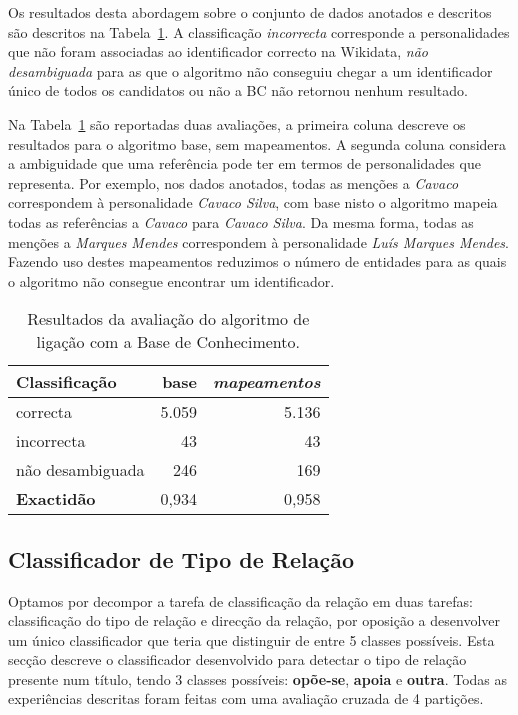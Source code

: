 \documentclass[a4paper, twocolumn, 11pt, twoside]{article}
\begin{document}
Os resultados desta abordagem sobre o conjunto de dados anotados e descritos são descritos na Tabela~\ref{tab:ent_linking_results}. A classificação \textit{incorrecta} corresponde a personalidades que não foram associadas ao identificador correcto na Wikidata, \textit{não desambiguada} para as que o algoritmo não conseguiu chegar a um identificador único de todos os candidatos ou não a BC não retornou nenhum resultado.

Na Tabela~\ref{tab:ent_linking_results} são reportadas duas avaliações, a primeira coluna descreve os resultados para o algoritmo base, sem mapeamentos. A segunda coluna considera a ambiguidade que uma referência pode ter em termos de personalidades que representa. Por exemplo, nos dados anotados, todas as menções a \textit{Cavaco} correspondem à personalidade \textit{Cavaco Silva}, com base nisto o algoritmo mapeia todas as referências a \textit{Cavaco} para \textit{Cavaco Silva}. Da mesma forma, todas as menções a \textit{Marques Mendes} correspondem à personalidade \textit{Luís Marques Mendes}. Fazendo uso destes mapeamentos reduzimos o número de entidades para as quais o algoritmo não consegue encontrar um identificador.

\begin{table}
    \begin{center}
    \begin{tabular}{l rr}
        {\bf Classificação} & {\bf base} & \it{{\bf mapeamentos}} \\
        \hline
        correcta            &   5.059    &  5.136   \\
        incorrecta          &      43    &    43    \\
		não desambiguada    &     246    &   169    \\    
        \hline
		{\bf Exactidão }    &   0,934	 &  0,958   \\
    \end{tabular}
	\caption{Resultados da avaliação do algoritmo de ligação com a Base de Conhecimento.}
	\label{tab:ent_linking_results}
	\end{center}
\end{table}

\subsection{Classificador de Tipo de Relação}
\label{subsec:rel_classifier}

Optamos por decompor a tarefa de classificação da relação em duas tarefas: classificação do tipo de relação e direcção da relação, por oposição a desenvolver um único classificador que teria que distinguir de entre 5 classes possíveis. Esta secção descreve o classificador desenvolvido para detectar o tipo de relação presente num título, tendo 3 classes possíveis: \textbf{opõe-se}, \textbf{apoia} e \textbf{outra}. Todas as experiências descritas foram feitas com uma avaliação cruzada de 4 partições.
\end{document}
